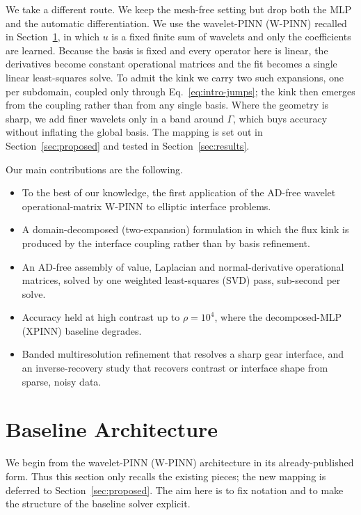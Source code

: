 \documentclass[preprint,12pt,authoryear]{elsarticle}
\begin{document}
We take a different route. We keep the mesh-free setting but drop both the MLP and the automatic differentiation. We use the wavelet-PINN (W-PINN) recalled in Section~\ref{sec:baseline}, in which $u$ is a fixed finite sum of wavelets and only the coefficients are learned. Because the basis is fixed and every operator here is linear, the derivatives become constant operational matrices and the fit becomes a single linear least-squares solve. To admit the kink we carry two such expansions, one per subdomain, coupled only through Eq.~\eqref{eq:intro-jumps}; the kink then emerges from the coupling rather than from any single basis. Where the geometry is sharp, we add finer wavelets only in a band around $\Gamma$, which buys accuracy without inflating the global basis. The mapping is set out in Section~\ref{sec:proposed} and tested in Section~\ref{sec:results}.

Our main contributions are the following.
\begin{itemize}
\item To the best of our knowledge, the first application of the AD-free wavelet operational-matrix W-PINN to elliptic interface problems.
\item A domain-decomposed (two-expansion) formulation in which the flux kink is produced by the interface coupling rather than by basis refinement.
\item An AD-free assembly of value, Laplacian and normal-derivative operational matrices, solved by one weighted least-squares (SVD) pass, sub-second per solve.
\item Accuracy held at high contrast up to $\rho=10^4$, where the decomposed-MLP (XPINN) baseline degrades.
\item Banded multiresolution refinement that resolves a sharp gear interface, and an inverse-recovery study that recovers contrast or interface shape from sparse, noisy data.
\end{itemize}

\section{Baseline Architecture}
\label{sec:baseline}

We begin from the wavelet-PINN (W-PINN) architecture in its already-published form. Thus this section only recalls the existing pieces; the new mapping is deferred to Section~\ref{sec:proposed}. The aim here is to fix notation and to make the structure of the baseline solver explicit.
\end{document}

